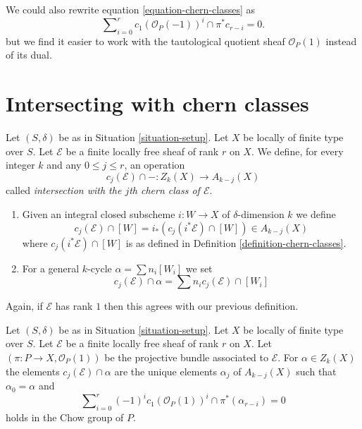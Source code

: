 \begin{remark}
\label{remark-equation-signs}
We could also rewrite equation \ref{equation-chern-classes} as
\begin{equation}
\label{equation-signs}
\sum\nolimits_{i = 0}^r
c_1(\mathcal{O}_P(-1))^i \cap \pi^*c_{r - i}
= 0.
\end{equation}
but we find it easier to work with the tautological quotient
sheaf $\mathcal{O}_P(1)$ instead of
its dual.
\end{remark}




\section{Intersecting with chern classes}
\label{section-intersecting-chern-classes}

\begin{definition}
\label{definition-cap-chern-classes}
Let $(S, \delta)$ be as in Situation \ref{situation-setup}.
Let $X$ be locally of finite type over $S$.
Let $\mathcal{E}$ be a finite locally free sheaf of rank $r$ on $X$.
We define, for every integer $k$ and any $0 \leq j \leq r$,
an operation
$$
c_j(\mathcal{E}) \cap - : Z_k(X) \to A_{k - j}(X)
$$
called {\it intersection with the $j$th chern class of $\mathcal{E}$}.
\begin{enumerate}
\item Given an integral closed subscheme $i : W \to X$ of $\delta$-dimension
$k$ we define
$$
c_j(\mathcal{E}) \cap [W] = i_*(c_j({i^*\mathcal{E}}) \cap [W])
\in
A_{k - j}(X)
$$
where $c_j({i^*\mathcal{E}}) \cap [W]$ is as defined in
Definition \ref{definition-chern-classes}.
\item For a general $k$-cycle $\alpha = \sum n_i [W_i]$ we set
$$
c_j(\mathcal{E}) \cap \alpha = \sum n_i c_j(\mathcal{E}) \cap [W_i]
$$
\end{enumerate}
\end{definition}

\noindent
Again, if $\mathcal{E}$ has rank $1$ then this agrees with our
previous definition.

\begin{lemma}
\label{lemma-determine-intersections}
Let $(S, \delta)$ be as in Situation \ref{situation-setup}.
Let $X$ be locally of finite type over $S$.
Let $\mathcal{E}$ be a finite locally free sheaf of rank $r$ on $X$.
Let $(\pi : P \to X, \mathcal{O}_P(1))$ be the projective bundle
associated to $\mathcal{E}$.
For $\alpha \in Z_k(X)$ the elements
$c_j(\mathcal{E}) \cap \alpha$ are the unique elements
$\alpha_j$ of $A_{k - j}(X)$
such that $\alpha_0 = \alpha$ and
$$
\sum\nolimits_{i = 0}^r
(-1)^i c_1(\mathcal{O}_P(1))^i \cap
\pi^*(\alpha_{r - i}) = 0
$$
holds in the Chow group of $P$.
\end{lemma}

